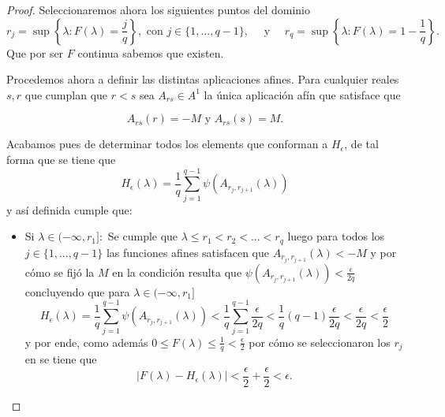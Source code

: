 \begin{proof}
    Seleccionaremos ahora los siguientes puntos del dominio
    \begin{equation}\label{lema:2_2_seleccion_r_F}
        r_j = \sup \left\{ \lambda: F(\lambda) = \frac{j}{q} \right\},
         \text{ con } j \in \{1, ..., q-1\}, 
         \quad \text{ y } \quad
        r_q = \sup \left\{ \lambda: F(\lambda) = 1 - \frac{1}{q} \right\}. 
    \end{equation}
    Que por ser $F$ continua sabemos que existen. 

    Procedemos ahora a definir las distintas aplicaciones afines. 
    Para cualquier reales $s,r$ que cumplan que $r < s$ sea $A_{rs}\in A^1$ la única aplicación afín que satisface que 
    
    \begin{equation}
        A_{rs}(r) = -M \text{ y }  A_{rs}(s) = M. 
    \end{equation} 
    
    Acabamos pues de determinar todos los elements que conforman a $H_\epsilon$, de tal forma que se tiene que
    \begin{equation}
        H_\epsilon(\lambda) = \frac{1}{q} \sum^{q-1}_{j=1} \psi( A_{r_j, r_{j+1}}(\lambda))
    \end{equation}
    y así definida cumple que: 
    \begin{itemize}
        \item Si $\lambda \in (- \infty, r_1]:$
        Se cumple que $\lambda \leq r_1 < r_2 <...< r_q$ luego  
        para todos los $j \in \{1, ..., q-1\}$ las funciones afines satisfacen que 
        $A_{r_j, r_{j+1}}(\lambda) < -M$ y por cómo se fijó la $M$ en la condición 
        resulta que  $\psi( A_{r_j, r_{j+1}}(\lambda)) < \frac{\epsilon}{2q}$ concluyendo que 
        para $\lambda \in (- \infty, r_1]$
        \begin{equation}
            H_\epsilon(\lambda) = \frac{1}{q} \sum^{q-1}_{j=1} \psi( A_{r_j, r_{j+1}}(\lambda)) 
            <
            \frac{1}{q} \sum^{q-1}_{j=1}  \frac{\epsilon}{2q}
            < 
            \frac{1}{q} (q-1) \frac{\epsilon }{2q}
            <\frac{\epsilon }{2q}
            < \frac{\epsilon }{2}
        \end{equation}
        y por ende, como además $0 \leq F(\lambda) \leq \frac{1}{q} < \frac{\epsilon}{2}$ por cómo se seleccionaron los $r_j$ en 
         se tiene que 
        \begin{equation}
            | F(\lambda) - H_{\epsilon}(\lambda) | < \frac{\epsilon}{2} + \frac{\epsilon}{2} < \epsilon. 
        \end{equation}


\end{itemize}
\end{proof}
